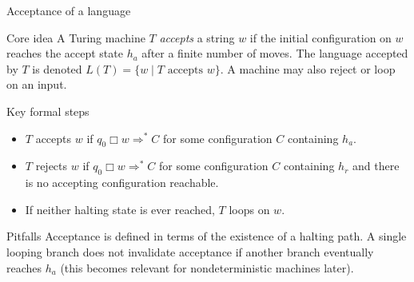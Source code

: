 \begin{frame}[t]{Acceptance of a language}
  \begin{tblock}{Core idea}
    A Turing machine $T$ \emph{accepts} a string $w$ if the initial
    configuration on $w$ reaches the accept state $h_a$ after a finite
    number of moves.  The language accepted by $T$ is denoted $L(T) =
    \{ w \mid T \text{ accepts } w \}$.  A machine may also reject or
    loop on an input.
  \end{tblock}
  \begin{tblock}{Key formal steps}
    \begin{itemize}
      \item $T$ accepts $w$ if $q_0\Box w \Rightarrow^* C$ for some
        configuration $C$ containing $h_a$.
      \item $T$ rejects $w$ if $q_0\Box w \Rightarrow^* C$ for some
        configuration $C$ containing $h_r$ and there is no accepting
        configuration reachable.
      \item If neither halting state is ever reached, $T$ loops on $w$.
    \end{itemize}
  \end{tblock}
  \begin{talert}{Pitfalls}
    Acceptance is defined in terms of the existence of a halting path.
    A single looping branch does not invalidate acceptance if another
    branch eventually reaches $h_a$ (this becomes relevant for
    nondeterministic machines later).
  \end{talert}
  \label{fr:7.2-01}
\end{frame}

